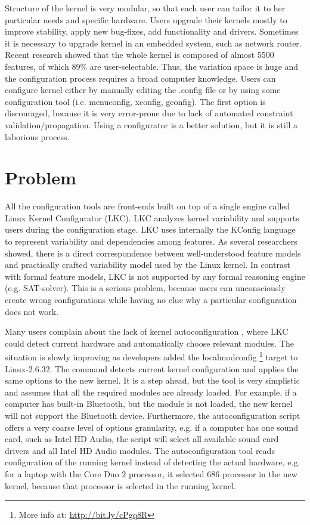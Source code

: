 \documentclass{chi2009}
\begin{document}

Structure of the kernel is very modular, so that each user can tailor it to her particular needs and specific hardware. Users upgrade their kernels mostly to improve stability, apply new bug-fixes, add functionality and drivers. Sometimes it is necessary to upgrade kernel in an embedded system, such as network router. Recent research \cite{she:kernel:2010} showed that the whole kernel is composed of almost 5500 features, of which 89\% are user-selectable. Thus, the variation space is huge and the configuration process requires a broad computer knowledge. Users can configure kernel either by manually editing the \textsf{.config} file or by using some configuration tool (i.e. \textsf{menuconfig, xconfig, gconfig}). The first option is discouraged, because it is very error-prone due to lack of automated constraint validation/propagation. Using a configurator is a better solution, but it is still a laborious process.

\section{Problem}
All the configuration tools are front-ends built on top of a single engine called Linux Kernel Configurator (LKC). LKC analyzes kernel variability and supports users during the configuration stage. LKC uses internally the KConfig language to represent variability and dependencies among features. As several researchers \cite{sincero:lkc:2008,she:kernel:2010} showed, there is a direct correspondence between well-understood feature models and practically crafted variability model used by the Linux kernel. In contrast with formal feature models, LKC is not supported by any formal reasoning engine (e.g. SAT-solver). This is a serious problem, because users can unconsciously create wrong configurations while having no clue why a particular configuration does not work.

Many users complain about the lack of kernel autoconfiguration \cite{debian:config:2010,soft32:config:2007}, where LKC could detect current hardware and automatically choose relevant modules. The situation is slowly improving as developers added the \textsf{localmodconfig} \footnote{More info at: \url{http://bit.ly/cPgq8R}} target to Linux-2.6.32. The command detects current kernel configuration and applies the same options to the new kernel. It is a step ahead, but the tool is very simplistic and assumes that all the required modules are already loaded. For example, if a computer has built-in Bluetooth, but the module is not loaded, the new kernel will not support the Bluetooth device. Furthermore, the autoconfiguration script offers a very coarse level of options granularity, e.g. if a computer has one sound card, such as Intel HD Audio, the script will select all available sound card drivers and all Intel HD Audio modules. The autoconfiguration tool reads configuration of the running kernel instead of detecting the actual hardware, e.g. for a laptop with the Core Duo 2 processor, it selected 686 processor in the new kernel, because that processor is selected in the running kernel.
\end{document}

